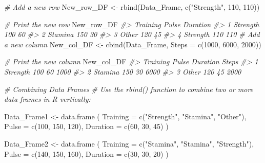 \documentclass[
]{book}
\newenvironment{Shaded}{\begin{snugshade}}{\end{snugshade}}
\newcommand{\AttributeTok}[1]{\textcolor[rgb]{0.77,0.63,0.00}{#1}}
\newcommand{\CommentTok}[1]{\textcolor[rgb]{0.56,0.35,0.01}{\textit{#1}}}
\newcommand{\DecValTok}[1]{\textcolor[rgb]{0.00,0.00,0.81}{#1}}
\newcommand{\FunctionTok}[1]{\textcolor[rgb]{0.00,0.00,0.00}{#1}}
\newcommand{\NormalTok}[1]{#1}
\newcommand{\OtherTok}[1]{\textcolor[rgb]{0.56,0.35,0.01}{#1}}
\newcommand{\StringTok}[1]{\textcolor[rgb]{0.31,0.60,0.02}{#1}}
\begin{document}
\begin{Shaded}
\begin{Highlighting}[]
\CommentTok{\# Add a new row}
\NormalTok{New\_row\_DF }\OtherTok{\textless{}{-}} \FunctionTok{rbind}\NormalTok{(Data\_Frame, }\FunctionTok{c}\NormalTok{(}\StringTok{"Strength"}\NormalTok{, }\DecValTok{110}\NormalTok{, }\DecValTok{110}\NormalTok{))}

\CommentTok{\# Print the new row}
\NormalTok{New\_row\_DF}
\CommentTok{\#\textgreater{}   Training Pulse Duration}
\CommentTok{\#\textgreater{} 1 Strength   100       60}
\CommentTok{\#\textgreater{} 2  Stamina   150       30}
\CommentTok{\#\textgreater{} 3    Other   120       45}
\CommentTok{\#\textgreater{} 4 Strength   110      110}
\CommentTok{\# Add a new column}
\NormalTok{New\_col\_DF }\OtherTok{\textless{}{-}} \FunctionTok{cbind}\NormalTok{(Data\_Frame, }\AttributeTok{Steps =} \FunctionTok{c}\NormalTok{(}\DecValTok{1000}\NormalTok{, }\DecValTok{6000}\NormalTok{, }\DecValTok{2000}\NormalTok{))}

\CommentTok{\# Print the new column}
\NormalTok{New\_col\_DF}
\CommentTok{\#\textgreater{}   Training Pulse Duration Steps}
\CommentTok{\#\textgreater{} 1 Strength   100       60  1000}
\CommentTok{\#\textgreater{} 2  Stamina   150       30  6000}
\CommentTok{\#\textgreater{} 3    Other   120       45  2000}

\CommentTok{\# Combining Data Frames}
\CommentTok{\# Use the rbind() function to combine two or more data frames in R vertically:}

\NormalTok{Data\_Frame1 }\OtherTok{\textless{}{-}} \FunctionTok{data.frame}\NormalTok{ (}
  \AttributeTok{Training =} \FunctionTok{c}\NormalTok{(}\StringTok{"Strength"}\NormalTok{, }\StringTok{"Stamina"}\NormalTok{, }\StringTok{"Other"}\NormalTok{),}
  \AttributeTok{Pulse =} \FunctionTok{c}\NormalTok{(}\DecValTok{100}\NormalTok{, }\DecValTok{150}\NormalTok{, }\DecValTok{120}\NormalTok{),}
  \AttributeTok{Duration =} \FunctionTok{c}\NormalTok{(}\DecValTok{60}\NormalTok{, }\DecValTok{30}\NormalTok{, }\DecValTok{45}\NormalTok{)}
\NormalTok{)}

\NormalTok{Data\_Frame2 }\OtherTok{\textless{}{-}} \FunctionTok{data.frame}\NormalTok{ (}
  \AttributeTok{Training =} \FunctionTok{c}\NormalTok{(}\StringTok{"Stamina"}\NormalTok{, }\StringTok{"Stamina"}\NormalTok{, }\StringTok{"Strength"}\NormalTok{),}
  \AttributeTok{Pulse =} \FunctionTok{c}\NormalTok{(}\DecValTok{140}\NormalTok{, }\DecValTok{150}\NormalTok{, }\DecValTok{160}\NormalTok{),}
  \AttributeTok{Duration =} \FunctionTok{c}\NormalTok{(}\DecValTok{30}\NormalTok{, }\DecValTok{30}\NormalTok{, }\DecValTok{20}\NormalTok{)}
\NormalTok{)}


\end{Highlighting}
\end{Shaded}
\end{document}
